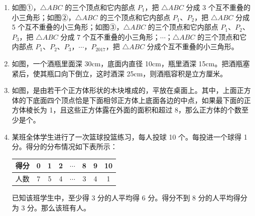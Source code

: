 \documentclass[11pt,a4paper]{ctexart}
\begin{document}
\begin{enumerate}
    \item 
    \begin{minipage}{0.65\textwidth}
        如图①，$\triangle ABC$ 的三个顶点和它内部点 $P_1$，把 $\triangle ABC$ 分成 3 个互不重叠的小三角形；如图②，$\triangle ABC$ 的三个顶点和它内部点 $P_1$、$P_2$，把 $\triangle ABC$ 分成 5 个互不重叠的小三角形；如图③，$\triangle ABC$ 的三个顶点和它内部点 $P_1$、$P_2$、$P_3$，把 $\triangle ABC$ 分成 7 个互不重叠的小三角形；$\cdots$；$\triangle ABC$ 的三个顶点和它内部点 $P_1$、$P_2$、$P_3$，$\cdots$，$P_{2017}$，把 $\triangle ABC$ 分成\underline{\hspace{2cm}}个互不重叠的小三角形。
    \end{minipage}
    \hfill
    \begin{minipage}{0.3\textwidth}
    \end{minipage}
    
    \item 如图，一个酒瓶里面深 30cm，底面内直径 10cm，瓶里酒深 15cm。把酒瓶塞紧后，使其瓶口向下倒立，这时酒深 25cm，则酒瓶容积是\underline{\hspace{2cm}}立方厘米。\vspace{1.2cm}
    
    \item 如图，是由若干个正方体形状的木块堆成的，平放在桌面上。其中，上面正方体的下底面四个顶点恰是下面相邻正方体上底面各边的中点，如果最下面的正方体棱长为 1，且这些正方体露在外面的面积和超过 8，那么正方体的个数至少是\underline{\hspace{2cm}}个。\vspace{1.2cm}
    
    \item 某班全体学生进行了一次篮球投篮练习，每人投球 10 个。每投进一个球得 1 分。得分的分布情况如下表所示：
    \begin{table}[htbp]
        \centering
        \begin{tabular}{|c|c|c|c|c|c|c|c|}
            \hline
            得分 & 0 & 1 & 2 & $\cdots$ & 8 & 9 & 10 \\
            \hline
            人数 & 7 & 5 & 4 & $\cdots$ & 3 & 4 & 1 \\
            \hline
        \end{tabular}
    \end{table}
    已知该班学生中，至少得 3 分的人平均得 6 分。得分不到 8 分的人平均得分为 3 分。那么该班有\underline{\hspace{2cm}}人。\vspace{1.2cm}
    

\end{enumerate}
\end{document}
